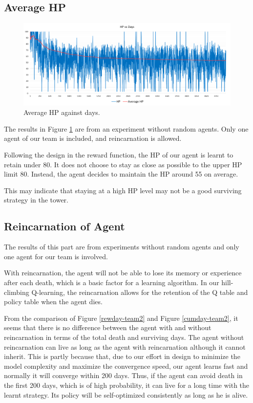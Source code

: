 \subsection{Average HP}
\begin{figure}
\centering
\includegraphics{004_team_2_agent_design/avhpdays}
\caption{Average HP against days.}
\label{avhp-team2}
\end{figure}

The results in Figure \ref{avhp-team2} are from an experiment without random agents. Only one agent of our team is included, and reincarnation is allowed. 

Following the design in the reward function, the HP of our agent is learnt to retain under 80. It does not choose to stay as close as possible to the upper HP limit 80. Instead, the agent decides to maintain the HP around 55 on average. 

This may indicate that staying at a high HP level may not be a good surviving strategy in the tower. 

\subsection{Reincarnation of Agent}
The results of this part are from experiments without random agents and only one agent for our team is involved.

With reincarnation, the agent will not be able to lose its memory or experience after each death, which is a basic factor for a learning algorithm. In our hill-climbing Q-learning, the reincarnation allows for the retention of the Q table and policy table when the agent dies. 

From the comparison of Figure \ref{rewday-team2} and Figure \ref{cumday-team2}, it seems that there is no difference between the agent with and without reincarnation in terms of the total death and surviving days. The agent without reincarnation can live as long as the agent with reincarnation although it cannot inherit. This is partly because that, due to our effort in design to minimize the model complexity and maximize the convergence speed, our agent learns fast and normally it will converge within 200 days. Thus, if the agent can avoid death in the first 200 days, which is of high probability, it can live for a long time with the learnt strategy. Its policy will be self-optimized consistently as long as he is alive. 

